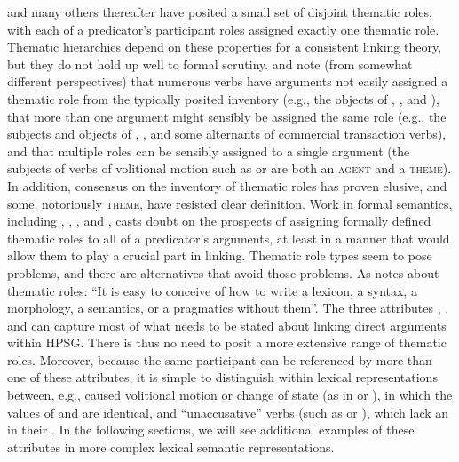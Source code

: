 \documentclass[output=paper,biblatex,babelshorthands,newtxmath,draftmode,colorlinks, citecolor=brown]{langscibook}
\begin{document}
\largerpage
\citet{Fillmore1968} and many others thereafter have posited a small set of disjoint thematic roles,
with each of a predicator's participant roles assigned exactly one thematic role.  Thematic
hierarchies depend on these properties for a consistent linking theory, but they do not hold up well
to formal scrutiny.  \citet{Jackendoff1987} and \citet{Dowty1991} note (from somewhat different
perspectives) that numerous verbs have arguments not easily assigned a thematic role from the
typically posited inventory (e.g., the objects of , , and ), that
more than one argument might sensibly be assigned the same role (e.g., the subjects and objects of
, , and some alternants of commercial transaction verbs), and that
multiple roles can be sensibly assigned to a single argument (the subjects of verbs of volitional
motion such as  or  are both an \textsc{agent} and a \textsc{theme}).  In
addition, consensus on the inventory of thematic roles has proven elusive, and some, notoriously
\textsc{theme}, have resisted clear definition.  Work in formal semantics, including
\citet{LadusawandDowty1988}, \citet{Dowty1989}, \citet{Landman2000}, and \citet{Schein2002}, casts
doubt on the prospects of assigning formally defined thematic roles to all of a predicator's
arguments, at least in a manner that would allow them to play a crucial part in linking.  Thematic
role types seem to pose problems, and there are alternatives that avoid those problems.  As
\citet[35]{Carlson1998} notes about thematic roles: ``It is easy to conceive of how to write a
lexicon, a syntax, a morphology, a semantics, or a pragmatics without them''.  The three attributes
, , and  can capture most of what needs to be stated about linking
direct arguments within HPSG.  There is thus no need to posit a more extensive range of thematic
roles.  Moreover, because the same participant can be referenced by more than one of these
attributes, it is simple to distinguish within lexical representations between, e.g., caused
volitional motion or change of state (as in  or ), in which the values of
 and  are identical, and ``unaccusative'' verbs (such as  or
), which lack an  in their .  In the following sections, we
will see additional examples of these attributes in more complex lexical semantic representations.%
%
%
\end{document}
